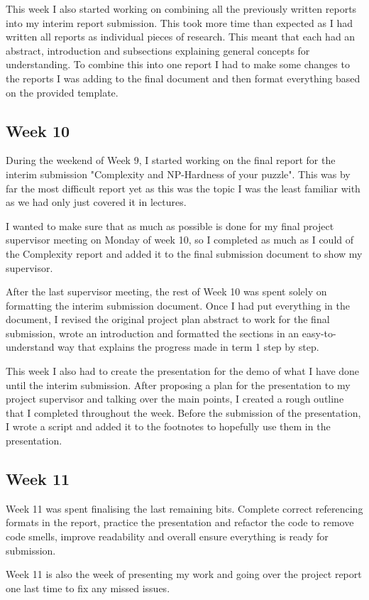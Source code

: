 \documentclass{article}
\begin{document}
This week I also started working on combining all the previously written reports into my interim report submission. This took more time than expected as I had written all reports as individual pieces of research. This meant that each had an abstract, introduction and subsections explaining general concepts for understanding. To combine this into one report I had to make some changes to the reports I was adding to the final document and then format everything based on the provided template.

\newpage

\subsection{Week 10}
During the weekend of Week 9, I started working on the final report for the interim submission "Complexity and NP-Hardness of your puzzle". This was by far the most difficult report yet as this was the topic I was the least familiar with as we had only just covered it in lectures. 

I wanted to make sure that as much as possible is done for my final project supervisor meeting on Monday of week 10, so I completed as much as I could of the Complexity report and added it to the final submission document to show my supervisor. 

After the last supervisor meeting, the rest of Week 10 was spent solely on formatting the interim submission document. Once I had put everything in the document, I revised the original project plan abstract to work for the final submission, wrote an introduction and formatted the sections in an easy-to-understand way that explains the progress made in term 1 step by step.

This week I also had to create the presentation for the demo of what I have done until the interim submission. After proposing a plan for the presentation to my project supervisor and talking over the main points, I created a rough outline that I completed throughout the week. Before the submission of the presentation, I wrote a script and added it to the footnotes to hopefully use them in the presentation.

\subsection{Week 11}
Week 11 was spent finalising the last remaining bits. Complete correct referencing formats in the report, practice the presentation and refactor the code to remove code smells, improve readability and overall ensure everything is ready for submission.

Week 11 is also the week of presenting my work and going over the project report one last time to fix any missed issues.
\end{document}
